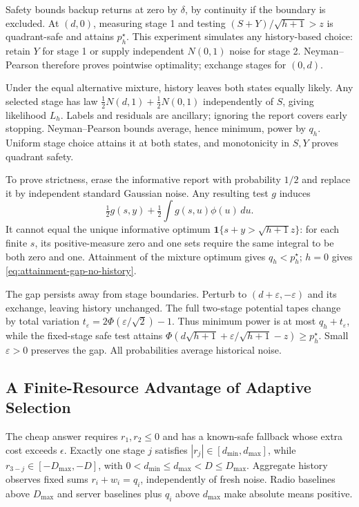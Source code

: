 \begin{IEEEproof}
Safety bounds backup returns at zero by $\delta$, by continuity if the boundary is excluded. At $(d,0)$, measuring stage 1 and testing $(S+Y)/\sqrt{h+1}>z$ is quadrant-safe and attains $p_h^\star$. This experiment simulates any history-based choice: retain $Y$ for stage 1 or supply independent $N(0,1)$ noise for stage 2. Neyman--Pearson therefore proves pointwise optimality; exchange stages for $(0,d)$.

Under the equal alternative mixture, history leaves both states equally likely. Any selected stage has law $\tfrac12N(d,1)+\tfrac12N(0,1)$ independently of $S$, giving likelihood $L_h$. Labels and residuals are ancillary; ignoring the report covers early stopping. Neyman--Pearson bounds average, hence minimum, power by $q_h$. Uniform stage choice attains it at both states, and monotonicity in $S,Y$ proves quadrant safety.

To prove strictness, erase the informative report with probability $1/2$ and replace it by independent standard Gaussian noise. Any resulting test $g$ induces
$$\tfrac12g(s,y)+\tfrac12\int g(s,u)\phi(u)\,du.$$
It cannot equal the unique informative optimum $\mathbf1\{s+y>\sqrt{h+1}z\}$: for each finite $s$, its positive-measure zero and one sets require the same integral to be both zero and one. Attainment of the mixture optimum gives $q_h<p_h^\star$; $h=0$ gives \eqref{eq:attainment-gap-no-history}.

The gap persists away from stage boundaries. Perturb to $(d+\varepsilon,-\varepsilon)$ and its exchange, leaving history unchanged. The full two-stage potential tapes change by total variation $t_\varepsilon=2\Phi(\varepsilon/\sqrt2)-1$. Thus minimum power is at most $q_h+t_\varepsilon$, while the fixed-stage safe test attains $\Phi(d\sqrt{h+1}+\varepsilon/\sqrt{h+1}-z)\geq p_h^\star$. Small $\varepsilon>0$ preserves the gap. All probabilities average historical noise.
\end{IEEEproof}

\subsection{A Finite-Resource Advantage of Adaptive Selection}
\label{sec:adaptive-separation}
\label{app:adaptive-separation}

The cheap answer requires $r_1,r_2\leq0$ and has a known-safe fallback whose extra cost exceeds $\epsilon$. Exactly one stage $j$ satisfies $|r_j|\in[d_{\min},d_{\max}]$, while $r_{3-j}\in[-D_{\max},-D]$, with $0<d_{\min}\leq d_{\max}<D\leq D_{\max}$. Aggregate history observes fixed sums $r_i+w_i=q_i$, independently of fresh noise. Radio baselines above $D_{\max}$ and server baselines plus $q_i$ above $d_{\max}$ make absolute means positive.

